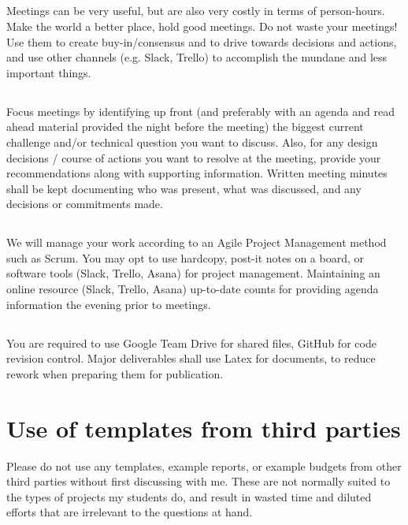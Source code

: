 \documentclass[10pt,courier]{navymemo}
\begin{document}
\subsection{} Meetings can be very useful, but are also very costly in terms of person-hours.  Make the world a better place, hold good meetings.  Do not waste your meetings! Use them to create buy-in/consensus and to drive towards decisions and actions, and use other channels (e.g. Slack, Trello) to accomplish the mundane and less important things.
\subsection{} Focus meetings by identifying up front (and preferably with an agenda and read ahead material provided the night before the meeting) the biggest current challenge and/or technical question you want to discuss. Also, for any design decisions / course of actions you want to resolve at the meeting, provide your recommendations along with supporting information. Written meeting minutes shall be kept documenting who was present, what was discussed, and any decisions or commitments made.  
\subsection{} We will manage your work according to an Agile Project Management method such as Scrum. You may opt to use hardcopy, post-it notes on a board, or software tools (Slack, Trello, Asana) for project management.   Maintaining an online resource (Slack, Trello, Asana) up-to-date counts for providing agenda information the evening prior to meetings. 
\subsection{} You are required to use Google Team Drive for shared files, GitHub for code revision control. Major deliverables shall use Latex for documents, to reduce rework when preparing them for publication.

\section{Use of templates from third parties} Please do not use any templates, example reports, or example budgets from other third parties without first discussing with me. These are not normally suited to the types of projects my students do, and result in wasted time and diluted efforts that are irrelevant to the questions at hand. 
\end{document}
